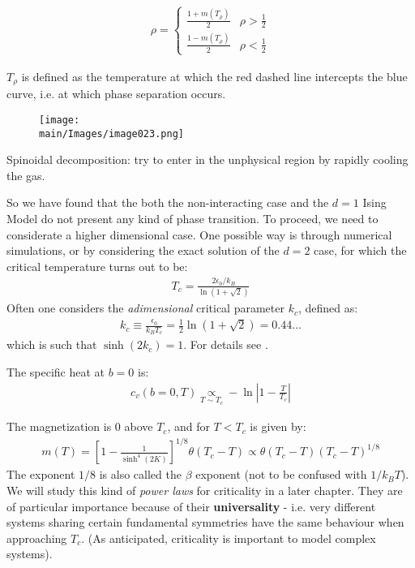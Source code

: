 \documentclass[../../main.tex]{subfiles}
\begin{document}
\begin{align*}
    \rho = \begin{cases}
        \frac{1+m(T_\rho)}{2} & \rho > \frac{1}{2}\\
        \frac{1-m(T_\rho)}{2} & \rho < \frac{1}{2}    
    \end{cases}
\end{align*}

$T_\rho$ is defined as the temperature at which the red dashed line intercepts the blue curve, i.e. at which phase separation occurs. 



\begin{figure}[H]
    \centering
    \texttt{[image: \\main/Images/image023.png]}
    \caption{\label{fig:fluid-phases}}
\end{figure}

Spinoidal decomposition: try to enter in the unphysical region by rapidly cooling the gas. 

\medskip

So we have found that the both the non-interacting case and the $d=1$ Ising Model do not present any kind of phase transition. To proceed, we need to considerate a higher dimensional case. One possible way is through numerical simulations, or by considering the exact solution of the $d=2$ case, for which the critical temperature turns out to be:
\begin{align*}
    T_c = \frac{2 \epsilon_0 / k_B}{\ln (1 + \sqrt{2})} 
\end{align*}
Often one considers the \textit{adimensional} critical parameter $k_c$, defined as:
\begin{align*}
    k_c \equiv \frac{\epsilon_0}{k_B T_c} = \frac{1}{2} \ln (1 + \sqrt{2}) = 0.44\dots  
\end{align*} 
which is such that $\sinh(2k_c) = 1$. %
For details see \cite{huang}. 

The specific heat at $b=0$ is:
\begin{align*}
    c_v(b=0, T) \underset{T \sim T_c}{\propto} - \ln \left|1-\frac{T}{T_c}  \right|
\end{align*}

The magnetization is $0$ above $T_c$, and for $T < T_c$ is given by:
\begin{align*}
    m(T) = \left[1-\frac{1}{\sinh^4(2K)} \right]^{1/8} \theta(T_c-T) \propto \theta(T_c - T) (T_c - T)^{1/8}
\end{align*}
The exponent $1/8$ is also called the $\beta$ exponent (not to be confused with $1/k_B T$). We will study this kind of \textit{power laws} for criticality in a later chapter. They are of particular importance because of their \textbf{universality} - i.e. very different systems sharing certain fundamental symmetries have the same behaviour when approaching $T_c$. (As anticipated, criticality is important to model complex systems). %
\end{document}
